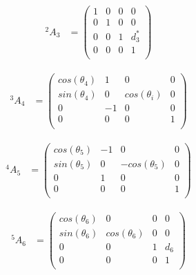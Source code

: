 \begin{align*}
^{2}A_3 &= 
\begin{pmatrix}
1 & 0 & 0 & 0 \\
0 & 1 & 0 & 0 \\
0 & 0 & 1 & d^*_3 \\
0 & 0 & 0 & 1 \\
\end{pmatrix}
\end{align*}

\begin{align*}
^{3}A_4 &= 
\begin{pmatrix}
cos(\theta_4) & 1 & 0 & 0 \\
sin(\theta_4) & 0 & cos(\theta_i) & 0 \\
0 & -1 & 0 & 0 \\
0 & 0 & 0 & 1 \\
\end{pmatrix}
\end{align*}

\begin{align*}
^{4}A_5 &= 
\begin{pmatrix}
cos(\theta_5) & -1 & 0 & 0 \\
sin(\theta_5) & 0 & -cos(\theta_5) & 0 \\
0 & 1 & 0 & 0 \\
0 & 0 & 0 & 1 \\
\end{pmatrix}
\end{align*}

\begin{align*}
^{5}A_6 &= 
\begin{pmatrix}
cos(\theta_6) & 0 & 0 & 0 \\
sin(\theta_6) & cos(\theta_6) & 0 & 0 \\
0 & 0 & 1 & d_6 \\
0 & 0 & 0 & 1 \\
\end{pmatrix}
\end{align*}